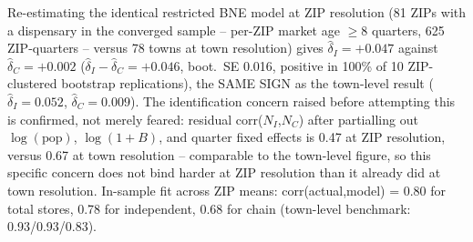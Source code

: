 Re-estimating the identical restricted BNE model at ZIP resolution (81 ZIPs with a dispensary in the converged sample -- per-ZIP market age $\geq 8$ quarters, 625 ZIP-quarters -- versus 78 towns at town resolution) gives $\hat\delta_I=+0.047$ against $\hat\delta_C=+0.002$ ($\hat\delta_I-\hat\delta_C=+0.046$, boot.\ SE 0.016, positive in 100\% of 10 ZIP-clustered bootstrap replications), the SAME SIGN as the town-level result ($\hat\delta_I=0.052$, $\hat\delta_C=0.009$). The identification concern raised before attempting this is confirmed, not merely feared: residual corr($N_I$,$N_C$) after partialling out $\log(\text{pop})$, $\log(1+B)$, and quarter fixed effects is 0.47 at ZIP resolution, versus 0.67 at town resolution -- comparable to the town-level figure, so this specific concern does not bind harder at ZIP resolution than it already did at town resolution. In-sample fit across ZIP means: corr(actual,model) = 0.80 for total stores, 0.78 for independent, 0.68 for chain (town-level benchmark: 0.93/0.93/0.83).